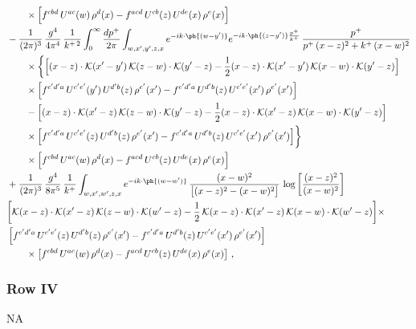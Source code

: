 \begin{align}
&\qquad\times\Big[f^{cbd}\,U^{ac}(w)\,\rho^{d}(x)-f^{acd}\,U^{cb}(z)\,U^{de}(x)\,\rho^{e}(x)\Big]\notag\\
&-\frac{1}{(2\pi)^{3}}\,\frac{g^{4}}{4\pi^{4}}\,\frac{1}{k^{+\,2}}\int_{0}^{\infty}\frac{dp^{+}}{2\pi}\int_{w,x',y',z,x}e^{-ik\cdot\ph{(w-y')}}e^{-ik\cdot\ph{(z-y')}\frac{p^{+}}{k^{+}}}\,\frac{p^{+}}{p^{+}\,(x-z)^{2}+k^{+}\,(x-w)^{2}}\notag\\
&\qquad\times\bigg\{\Big[(x-z)\cdot\mathcal{K}(x'-y')\,\mathcal{K}(z-w)\cdot\mathcal{K}(y'-z)-\frac{1}{2}(x-z)\cdot\mathcal{K}(x'-y')\,\mathcal{K}(x-w)\cdot\mathcal{K}(y'-z)\Big]\notag\\
&\qquad\times\Big[f^{c'd'a}\,U^{c'e'}(y')\,U^{d'b}(z)\,\rho^{e'}(x')-f^{c'd'a}\,U^{d'b}(z)\,U^{c'e'}(x')\,\rho^{e'}(x')\Big]\notag\\
&\qquad-\Big[(x-z)\cdot\mathcal{K}(x'-z)\,\mathcal{K}(z-w)\cdot\mathcal{K}(y'-z)-\frac{1}{2}(x-z)\cdot\mathcal{K}(x'-z)\,\mathcal{K}(x-w)\cdot\mathcal{K}(y'-z)\Big]\notag\\
&\qquad\times\Big[f^{c'd'a}\,U^{c'e'}(z)\,U^{d'b}(z)\,\rho^{e'}(x')-f^{c'd'a}\,U^{d'b}(z)\,U^{c'e'}(x')\,\rho^{e'}(x')\Big]\bigg\}\notag\\
&\qquad\times\Big[f^{cbd}\,U^{ac}(w)\,\rho^{d}(x)-f^{acd}\,U^{cb}(z)\,U^{de}(x)\,\rho^{e}(x)\Big]\notag\\
& +\frac{1}{(2\pi)^{3}}\,\frac{g^{4}}{8\pi^{5}}\,\frac{1}{k^{+}}\int_{w,x',w',z,x}e^{-ik\cdot\ph{(w-w')}}\,\frac{(x-w)^{2}}{\big[(x-z)^{2}-(x-w)^{2}\big]}\,\log\left[\frac{(x-z)^{2}}{(x-w)^{2}}\right]\notag \\ &  \bigg[\mathcal{K}(x-z)\cdot\mathcal{K}(x'-z)\,\mathcal{K}(z-w)\cdot\mathcal{K}(w'-z)-\frac{1}{2}\,\mathcal{K}(x-z)\cdot\mathcal{K}(x'-z)\,\mathcal{K}(x-w)\cdot\mathcal{K}(w'-z)\bigg]   \times\notag \\ & \left[f^{c'd'a}\,U^{c'e'}(z)\,U^{d'b}(z)\,\rho^{e'}(x')-f^{c'd'a}\, U^{d'b}(z)\,U^{c'e'}(x')\,\rho^{e'}(x')\right]\notag\\ &\qquad\times\left[f^{cbd}\,U^{ac}(w)\,\rho^{d}(x) -f^{acd}\,U^{cb}(z)\,U^{de}(x)\,\rho^{e}(x)\right]\,,\label{eq:D-III.III-2o}
\end{align}
\subsubsection*{Row IV}
\textsc{NA}
